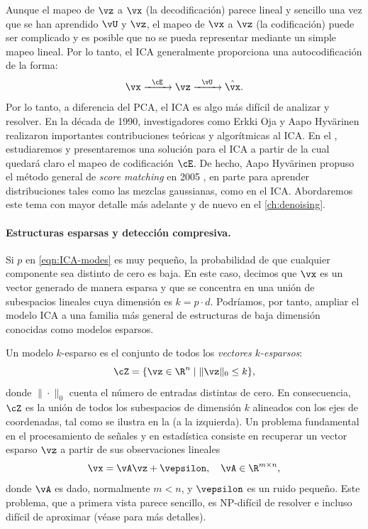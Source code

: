 \documentclass[../../book-main_es.tex]{subfiles}
\begin{document}
Aunque el mapeo de \(\vz\) a \(\vx\) (la decodificación) parece lineal
y sencillo una vez que se han aprendido \(\vU\) y \(\vz\), el
mapeo de \(\vx\) a \(\vz\) (la codificación) puede ser complicado y es posible
que no se pueda representar mediante un simple mapeo lineal. Por lo tanto, el ICA generalmente
proporciona una autocodificación de la forma:
\begin{equation}
    \vx   \xrightarrow{\hspace{2mm} \cE\hspace{2mm}} \vz
    \xrightarrow{\hspace{2mm} \vU \hspace{2mm}} \hat{\vx}.
    \label{eqn:auto-encoding-ICA}
\end{equation}
Por lo tanto, a diferencia del PCA, el ICA es algo más difícil de analizar y
resolver. En la década de 1990, investigadores como Erkki Oja y Aapo
Hyvärinen \cite{hyvarinen-1997,Hyvrinen-2000} realizaron importantes
contribuciones teóricas y algorítmicas al ICA. En el , 
estudiaremos y presentaremos una solución para el ICA a partir de la cual
quedará claro el mapeo de codificación \(\cE\). De hecho,  Aapo
Hyv\"{a}rinen propuso el método general de \textit{score matching} en 2005
\cite{hyvarinen05a}, en parte para aprender distribuciones tales como las mezclas
gaussianas, como en el ICA. Abordaremos este tema con mayor detalle más adelante y
de nuevo en el \ref{ch:denoising}.

\paragraph{Estructuras esparsas y detección compresiva.}
Si \(p\) en \eqref{eqn:ICA-modes} es muy pequeño, la probabilidad de que
cualquier componente sea distinto de cero es baja. En este caso, decimos que \(\vx\) es
un vector generado de manera esparsa y que se concentra en una unión de subespacios lineales
cuya dimensión es \(k = p \cdot d\). Podríamos, por tanto, ampliar el modelo ICA
a una familia más general de estructuras de baja dimensión conocidas como
modelos esparsos.

Un modelo \(k\)-esparso es el conjunto de todos los \textit{vectores \(k\)-esparsos}:
\begin{equation}
    \cZ = \{\vz \in \R^{n} \mid \|\vz\|_{0} \leq k\},
\end{equation}
donde \(\|\cdot\|_{0}\) cuenta el número de entradas distintas de cero. En consecuencia,
\(\cZ\) es la unión de todos los subespacios de dimensión \(k\) alineados con
los ejes de coordenadas, tal como se ilustra en la 
(a la izquierda). Un problema fundamental en el procesamiento de señales y en estadística consiste en
recuperar un vector esparso \(\vz\) a partir de sus observaciones lineales
\begin{equation}
    \vx = \vA \vz + \vepsilon, \quad \vA \in \R^{m\times n},
    \label{eqn:sparse-model}
\end{equation}
donde \(\vA\) es dado, normalmente \(m < n\), y \(\vepsilon\) es
un ruido pequeño. Este problema, que a primera vista parece sencillo, es NP-difícil de resolver e
incluso difícil de aproximar (véase \cite{Wright-Ma-2022} para más detalles).
\end{document}
